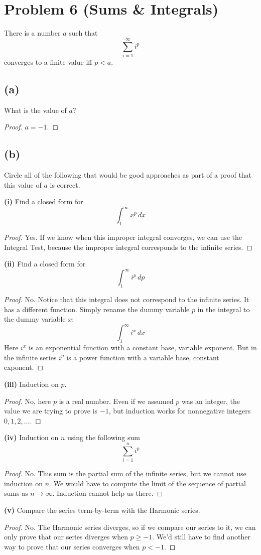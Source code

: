 \documentclass[14pt]{extarticle}
\begin{document}
\section{Problem 6 (Sums \& Integrals)}
There is a number $a$ such that
$$
\sum_{i=1}^{\infty}i^p
$$
converges to a finite value iff $p < a$.
\subsection{(a)}
What is the value of $a$?
\begin{proof}
$a = -1$.
\end{proof}

\subsection{(b)}
Circle all of the following that would be good approaches as part of a proof that this value of $a$ is correct.

{\bf (i)} Find a closed form for
$$
\int_1^{\infty}x^p\,dx
$$
\begin{proof}
Yes. If we know when this improper integral converges, we can use the Integral Test, because the improper integral corresponds to the infinite series.
\end{proof}
{\bf (ii)} Find a closed form for
$$
\int_1^{\infty}i^p\,dp
$$
\begin{proof}
No. Notice that this integral does not correspond to the infinite series. It has a different function. Simply rename the dummy variable $p$ in the integral to the dummy variable $x$:
$$
\int_1^{\infty}i^x\,dx
$$
Here $i^x$ is an exponential function with a constant base, variable exponent. But in the infinite series $i^p$ is a power function with a variable base, constant exponent.
\end{proof}
{\bf (iii)} Induction on $p$.
\begin{proof}
No, here $p$ is a real number. Even if we assumed $p$ was an integer, the value we are trying to prove is $-1$, but induction works for nonnegative integers $0, 1, 2, \ldots$.
\end{proof}
{\bf (iv)} Induction on $n$ using the following sum
$$
\sum_{i=1}^n i^p
$$
\begin{proof}
No. This sum is the partial sum of the infinite series, but we cannot use induction on $n$. We would have to compute the limit of the sequence of partial sums as $n \to \infty$. Induction cannot help us there.
\end{proof}
{\bf (v)} Compare the series term-by-term with the Harmonic series.
\begin{proof}
No. The Harmonic series diverges, so if we compare our series to it, we can only prove that our series diverges when $p \geq -1$. We'd still have to find another way to prove that our series converges when $p < -1$.
\end{proof}
\end{document}
